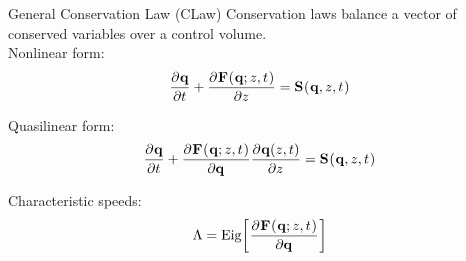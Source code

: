 \documentclass[10pt,t,xcolor=table]{beamer}
\begin{document}
    \begin{frame}{General Conservation Law (CLaw)}
        Conservation laws balance a vector of conserved variables \qCon over a control volume.\\[2em]
        
        Nonlinear form:
        \begin{equation}
            \pdiff{\qCon}{t} + \pdiff{\FluxFun{\qCon; z,t}}{z}= \SourceFun{\qCon,z,t}
            \label{Eqn:GeneralCLaw}
        \end{equation}
        
        Quasilinear form:
        \begin{equation}
            \pdiff{\qCon}{t} + \pdiff{\FluxFun{\qCon;z,t}}{\qCon}\pdiff{\qCon(z,t)}{z} = \SourceFun{\qCon,z,t}
            \label{Eqn:GeneralCLawQuasilinear}
        \end{equation}
        
        Characteristic speeds:
        \begin{equation}
            \Lambda = \mbox{Eig}\left[\pdiff{\FluxFun{\qCon;z,t}}{\qCon}\right]\label{Eqn:GeneralSpeeds}
        \end{equation}

    \end{frame}
    
    
\end{document}
